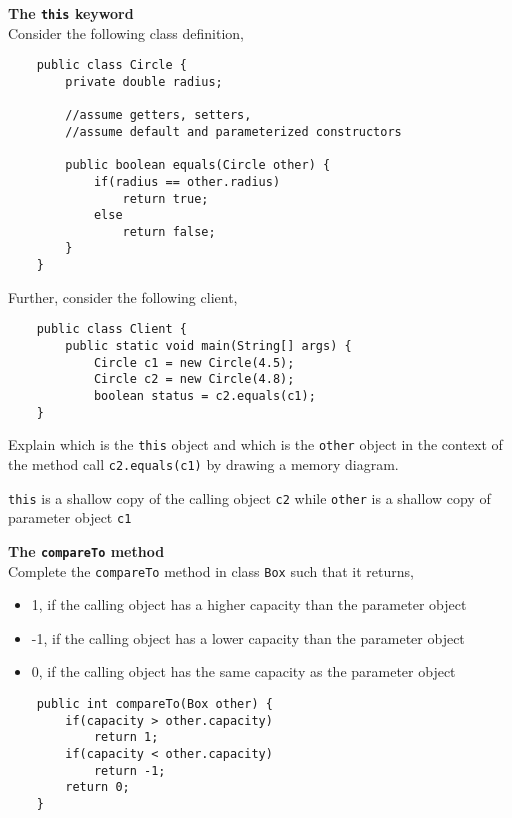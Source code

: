 \begin{questions}
\question \textbf{The \texttt{this} keyword}\\
Consider the following class definition,

\begin{lstlisting}
	public class Circle {
		private double radius;
		
		//assume getters, setters, 
		//assume default and parameterized constructors
		
		public boolean equals(Circle other) {
			if(radius == other.radius) 
				return true;
			else
				return false;
		}
	}
\end{lstlisting}

Further, consider the following client,

\begin{lstlisting}
	public class Client {
		public static void main(String[] args) {
			Circle c1 = new Circle(4.5);
			Circle c2 = new Circle(4.8);
			boolean status = c2.equals(c1);
	}
\end{lstlisting}

Explain which is the \texttt{this} object and which is the \texttt{other} object in the context of the method call \texttt{c2.equals(c1)} by drawing a memory diagram.

\begin{solution}
\texttt{this} is a shallow copy of the calling object \texttt{c2} while \texttt{other} is a shallow copy of parameter object \texttt{c1}
\end{solution}

\question \textbf{The \texttt{compareTo} method}\\
Complete the \texttt{compareTo} method in class \texttt{Box} such that it returns,

\begin{itemize}
\item 1, if the calling object has a higher capacity than the parameter object
\item -1, if the calling object has a lower capacity than the parameter object
\item 0, if the calling object has the same capacity as the parameter object
\end{itemize}

\begin{solution}
\begin{lstlisting}
	public int compareTo(Box other) {
		if(capacity > other.capacity)
			return 1;
		if(capacity < other.capacity)
			return -1;
		return 0;
	}
\end{lstlisting}
\end{solution}


\end{questions}

